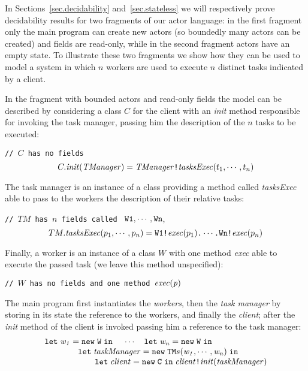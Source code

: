 \documentclass{LMCS}
\theoremstyle{plain}\newtheorem{proposition}[thm]{Proposition}
\theoremstyle{plain}\newtheorem{lemma}[thm]{Lemma}
\theoremstyle{plain}\newtheorem{theorem}[thm]{Theorem}
\theoremstyle{plain}\newtheorem{corollary}[thm]{Corollary}
\newcommand{\invk}{\mbox{\tt !}}
\newcommand{\prefix}{\mbox{\tt .}}
\newcommand{\newact}[1]{{\tt new} \; #1}
\newcommand{\letin}[3]{{\tt let} \; #1 = #2 \; {\tt in} \; #3}
\newcommand{\adef}[1]{{\tt #1}}
\begin{document}
\begin{exa}\label{ex:taskManager}
In Sections~\ref{sec.decidability} and~\ref{sec.stateless}
we will respectively prove decidability results for two fragments of our actor language:
in the first fragment only the main program can create new actors (so 
boundedly many actors can be created) and fields are read-only, while in the
second fragment actors have an empty state.
To illustrate these two fragments we show how they can be used to model
a system in which
$n$ workers are used to execute $n$ distinct tasks indicated by a client.

In the fragment with bounded actors and read-only fields the model can be described 
by considering a class $C$ for the client with an {\it init}
method responsible for invoking the task manager, passing him the description
of the $n$ tasks to be executed:

\; {\tt // $C$ has no fields} \[C.{\it init}({\it TManager}) =  {\it TManager} \invk {\it tasksExec}(t_1,\cdots,t_n)
\]


The task manager is an instance of a class providing a method called
{\it tasksExec} able to pass to the workers the description of their 
relative tasks:

\; {\tt // $TM$ has $n$ fields called} \ ${\tt W1},\cdots,{\tt Wn}$,
\[TM.{\it tasksExec}(p_1,\cdots,p_n) =  {\tt W1} \invk {\it exec}(p_1)
\prefix \cdots \prefix {\tt Wn} \invk{\it exec}(p_n)
\]

Finally, a worker is an instance of a class $W$ with one method
{\it exec} able to execute the passed task (we leave this method
unspecified):

\; {\tt // $W$ has no fields and one method ${\it exec(p)}$} 

The main program first instantiates the {\it workers},
then the {\it task manager} by storing in its state the reference
to the workers, and finally the {\it client}; after the {\it init}
method of the client is invoked passing him a reference to the
task manager:
$$
\begin{array}{l}
\letin{{\it w_1}}{\newact{\adef{W}}}{}
\quad\cdots\quad 
\letin{{\it w_n}}{\newact{\adef{W}}}{ }
\\
\qquad \qquad 
\letin{{\it taskManager}}{\newact{\adef{TM}}s({\it w_1},\cdots,{\it w_n})}{}
\\
\qquad \qquad \qquad 
\letin{{\it client}}{\newact{\adef{C}}}{}
{\it client} \invk {\it init}({\it taskManager}) 
\end{array}
$$


\end{exa}
\end{document}
